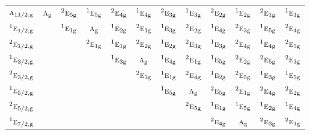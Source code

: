 \documentclass[10pt,a4paper]{article}
\numberwithin{equation}{section}
\newcommand{\irr}[1]{\text{\normalfont\scshape #1}}
\newcommand{\conjpair}[1]{{}^{#1}}
\newcommand{\ptag}[1]{\mathrm{#1}}
\begin{document}
{\begin{longtable}{@{}lccccccccccc@{}}
$\irr{a}_{11/2,\ptag{g}}$ & $\irr{a}_{\ptag{g}}$ & $\conjpair{2}\irr{e}_{5\ptag{g}}$ & $\conjpair{1}\irr{e}_{5\ptag{g}}$ & $\conjpair{2}\irr{e}_{4\ptag{g}}$ & $\conjpair{1}\irr{e}_{4\ptag{g}}$ & $\conjpair{2}\irr{e}_{3\ptag{g}}$ & $\conjpair{1}\irr{e}_{3\ptag{g}}$ & $\conjpair{2}\irr{e}_{2\ptag{g}}$ & $\conjpair{1}\irr{e}_{2\ptag{g}}$ & $\conjpair{2}\irr{e}_{1\ptag{g}}$ & $\conjpair{1}\irr{e}_{1\ptag{g}}$\\
$\conjpair{1}\irr{e}_{1/2,\ptag{g}}$ &  & $\conjpair{1}\irr{e}_{1\ptag{g}}$ & $\irr{a}_{\ptag{g}}$ & $\conjpair{1}\irr{e}_{2\ptag{g}}$ & $\conjpair{2}\irr{e}_{1\ptag{g}}$ & $\conjpair{1}\irr{e}_{3\ptag{g}}$ & $\conjpair{2}\irr{e}_{2\ptag{g}}$ & $\conjpair{1}\irr{e}_{4\ptag{g}}$ & $\conjpair{2}\irr{e}_{3\ptag{g}}$ & $\conjpair{1}\irr{e}_{5\ptag{g}}$ & $\conjpair{2}\irr{e}_{4\ptag{g}}$\\
$\conjpair{2}\irr{e}_{1/2,\ptag{g}}$ &  &  & $\conjpair{2}\irr{e}_{1\ptag{g}}$ & $\conjpair{1}\irr{e}_{1\ptag{g}}$ & $\conjpair{2}\irr{e}_{2\ptag{g}}$ & $\conjpair{1}\irr{e}_{2\ptag{g}}$ & $\conjpair{2}\irr{e}_{3\ptag{g}}$ & $\conjpair{1}\irr{e}_{3\ptag{g}}$ & $\conjpair{2}\irr{e}_{4\ptag{g}}$ & $\conjpair{1}\irr{e}_{4\ptag{g}}$ & $\conjpair{2}\irr{e}_{5\ptag{g}}$\\
$\conjpair{1}\irr{e}_{3/2,\ptag{g}}$ &  &  &  & $\conjpair{1}\irr{e}_{3\ptag{g}}$ & $\irr{a}_{\ptag{g}}$ & $\conjpair{1}\irr{e}_{4\ptag{g}}$ & $\conjpair{2}\irr{e}_{1\ptag{g}}$ & $\conjpair{1}\irr{e}_{5\ptag{g}}$ & $\conjpair{2}\irr{e}_{2\ptag{g}}$ & $\conjpair{2}\irr{e}_{5\ptag{g}}$ & $\conjpair{2}\irr{e}_{3\ptag{g}}$\\
$\conjpair{2}\irr{e}_{3/2,\ptag{g}}$ &  &  &  &  & $\conjpair{2}\irr{e}_{3\ptag{g}}$ & $\conjpair{1}\irr{e}_{1\ptag{g}}$ & $\conjpair{2}\irr{e}_{4\ptag{g}}$ & $\conjpair{1}\irr{e}_{2\ptag{g}}$ & $\conjpair{2}\irr{e}_{5\ptag{g}}$ & $\conjpair{1}\irr{e}_{3\ptag{g}}$ & $\conjpair{1}\irr{e}_{5\ptag{g}}$\\
$\conjpair{1}\irr{e}_{5/2,\ptag{g}}$ &  &  &  &  &  & $\conjpair{1}\irr{e}_{5\ptag{g}}$ & $\irr{a}_{\ptag{g}}$ & $\conjpair{2}\irr{e}_{5\ptag{g}}$ & $\conjpair{2}\irr{e}_{1\ptag{g}}$ & $\conjpair{2}\irr{e}_{4\ptag{g}}$ & $\conjpair{2}\irr{e}_{2\ptag{g}}$\\
$\conjpair{2}\irr{e}_{5/2,\ptag{g}}$ &  &  &  &  &  &  & $\conjpair{2}\irr{e}_{5\ptag{g}}$ & $\conjpair{1}\irr{e}_{1\ptag{g}}$ & $\conjpair{1}\irr{e}_{5\ptag{g}}$ & $\conjpair{1}\irr{e}_{2\ptag{g}}$ & $\conjpair{1}\irr{e}_{4\ptag{g}}$\\
$\conjpair{1}\irr{e}_{7/2,\ptag{g}}$ &  &  &  &  &  &  &  & $\conjpair{2}\irr{e}_{4\ptag{g}}$ & $\irr{a}_{\ptag{g}}$ & $\conjpair{2}\irr{e}_{3\ptag{g}}$ & $\conjpair{2}\irr{e}_{1\ptag{g}}$\\

\end{longtable}}
\end{document}
